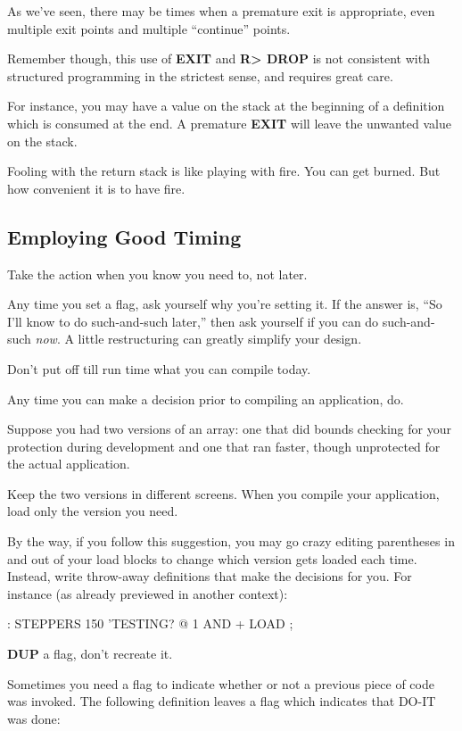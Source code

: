 As we've seen, there may be times when a premature exit is appropriate,
even multiple exit points and multiple ``continue'' points.

Remember though, this use of \textbf{EXIT} and \textbf{R> DROP} is not consistent
with structured programming in the strictest sense, and requires great
care.

For instance, you may have a value on the stack at the beginning of
a definition which is consumed at the end. A premature \textbf{EXIT} will leave
the unwanted value on the stack.

Fooling with the return stack is like playing with fire. You can get
burned. But how convenient it is to have fire.

\subsection{Employing Good Timing}
\begin{tip}
Take the action when you know you need to, not later.
\end{tip}
Any time you set a flag, ask yourself why you're setting it. If the answer
is, ``So I'll know to do such-and-such later,'' then ask yourself if you can
do such-and-such \emph{now}. A little restructuring can greatly simplify your
design.

\begin{tip}
Don't put off till run time what you can compile today.
\end{tip}
Any time you can make a decision prior to compiling an application, do.

Suppose you had two versions of an array: one that did bounds
checking for your protection during development and one that ran faster,
though unprotected for the actual application.

Keep the two versions in different screens. When you compile your
application, load only the version you need.

By the way, if you follow this suggestion, you may go crazy editing
parentheses in and out of your load blocks to change which version gets
loaded each time. Instead, write throw-away definitions that make the
decisions for you. For instance (as already previewed in another context):

\begin{Code}
: STEPPERS   150  'TESTING? @  1 AND +  LOAD ;
\end{Code}
\begin{tip}
\textbf{DUP} a flag, don't recreate it.
\end{tip}
Sometimes you need a flag to indicate whether or not a previous piece of
code was invoked. The following definition leaves a flag which indicates
that DO-IT was done:

